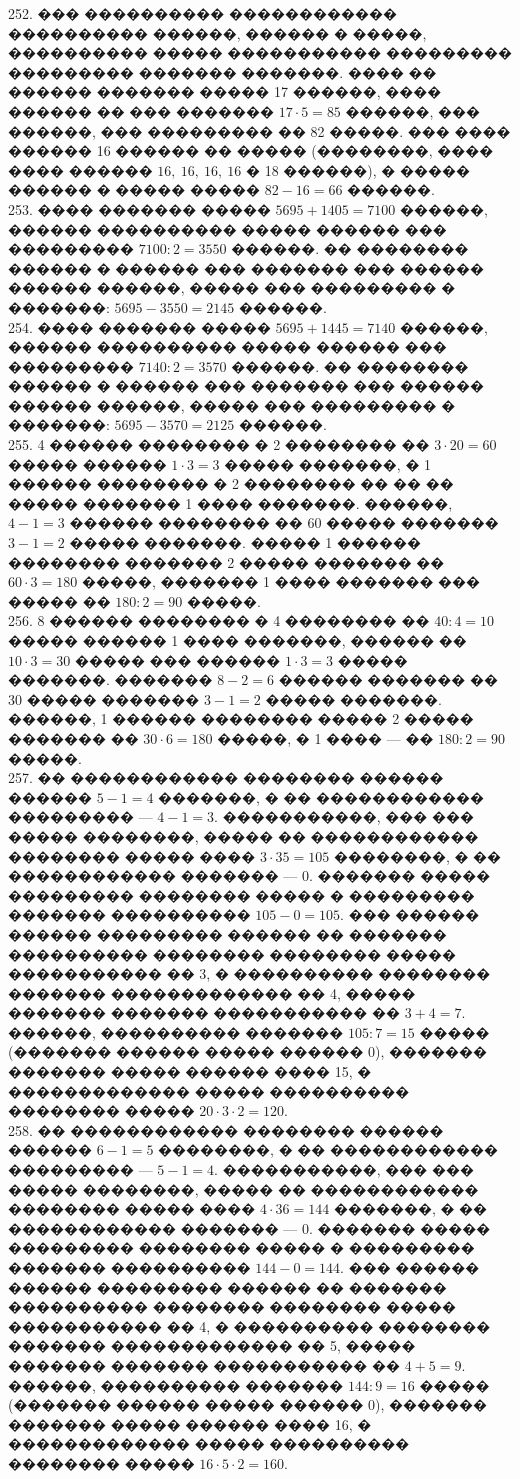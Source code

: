 \documentclass[12pt]{article}
\begin{document}
252. ��� ���������� ������������ ���������� ������, ������ � �����, ���������� ����� ����������� ��������� ��������� ������� �������. ���� �� ������ ������� ����� 17 ������, ���� ������ �� ��� ������� $17\cdot5=85$ ������, ��� ������, ��� ��������� �� 82 �����. ��� ���� ������ 16 ������ �� ����� (��������, ���� ���� ������ $16,\ 16,\ 16,\ 16$ � 18 ������), � ����� ������ � ����� ����� $82-16=66$ ������.\\
253. ���� ������� ����� $5695+1405=7100$ ������, ������ ���������� ����� ������ ��� ��������� $7100:2=3550$ ������. �� �������� ������ � ������ ��� ������� ��� ������ ������ ������, ����� ��� ��������� � �������: $5695-3550=2145$ ������.\\
254. ���� ������� ����� $5695+1445=7140$ ������, ������ ���������� ����� ������ ��� ��������� $7140:2=3570$ ������. �� �������� ������ � ������ ��� ������� ��� ������ ������ ������, ����� ��� ��������� � �������: $5695-3570=2125$ ������.\\
255. 4 ������ �������� � 2 �������� �� $3\cdot20=60$ ����� ������ $1\cdot3=3$ ����� �������, � 1 ������ �������� � 2 �������� �� �� �� ����� ������� 1 ���� �������. ������, $4-1=3$ ������ �������� �� 60 ����� ������� $3-1=2$ ����� �������. ����� 1 ������ �������� ������� 2 ����� ������� �� $60\cdot3=180$ �����, ������� 1 ���� ������� ��� ����� �� $180:2=90$ �����.\\
256. 8 ������ �������� � 4 �������� �� $40:4=10$ ����� ������ 1 ���� �������, ������ �� $10\cdot3=30$ ����� ��� ������ $1\cdot3=3$ ����� �������. ������� $8-2=6$ ������ ������� �� 30 ����� ������� $3-1=2$ ����� �������. ������, 1 ������ �������� ����� 2 ����� ������� �� $30\cdot6=180$ �����, � 1 ���� --- �� $180:2=90$ �����.\\
257. �� ������������ �������� ������ ������ $5-1=4$ �������, � �� ������������ ��������� --- $4-1=3.$ �����������, ��� ��� ����� ��������, ����� �� ������������ �������� ����� ���� $3\cdot35=105$ ��������, � �� ������������ ������� --- 0. ������� ����� ��������� �������� ����� � ��������� ������� ���������� $105-0=105.$ ��� ������ ������ ��������� ������ �� ������� ���������� �������� �������� ����� ����������� �� 3, � ���������� �������� ������� ������������� �� 4, ����� ������� ������� ����������� �� $3+4=7.$ ������, ���������� ������� $105:7=15$ ����� (������� ������ ����� ������ 0), ������� ������� ����� ������ ���� 15, � ������������� ����� ���������� �������� ����� $20\cdot3\cdot2=120.$\\
258. �� ������������ �������� ������ ������ $6-1=5$ ��������, � �� ������������ ��������� --- $5-1=4.$ �����������, ��� ��� ����� ��������, ����� �� ������������ �������� ����� ���� $4\cdot36=144$ �������, � �� ������������ ������� --- 0. ������� ����� ��������� �������� ����� � ��������� ������� ���������� $144-0=144.$ ��� ������ ������ ��������� ������ �� ������� ���������� �������� �������� ����� ����������� �� 4, � ���������� �������� ������� ������������� �� 5, ����� ������� ������� ����������� �� $4+5=9.$ ������, ���������� ������� $144:9=16$ ����� (������� ������ ����� ������ 0), ������� ������� ����� ������ ���� 16, � ������������� ����� ���������� �������� ����� $16\cdot5\cdot2=160.$\\
\end{document}
